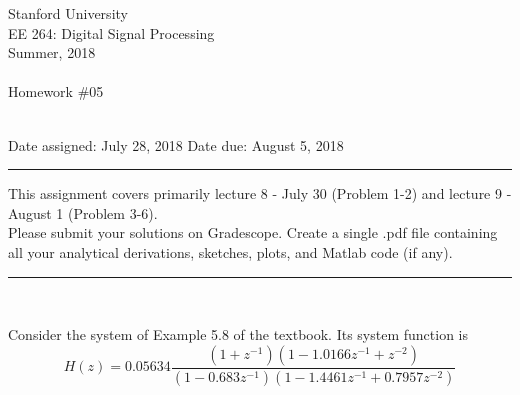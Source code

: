 \documentclass[12pt]{report}
\begin{document}
\thispagestyle{empty}
\begin{centering}
	{\large Stanford University}\\
	{\large EE 264: Digital Signal Processing}\\
	{\large Summer, 2018} \\
	\mbox{}\\
	{\large Homework \#05}\\
	\mbox{}\\
\end{centering}
\noindent Date assigned:  July 28, 2018 \hfill
Date due: August 5, 2018\\
\noindent \rule{6.5 in}{0.5pt}
  This assignment covers primarily lecture 8 - July 30 (Problem 1-2) and lecture 9 - August 1 (Problem 3-6). \\
  Please submit your solutions on Gradescope. Create a single .pdf file containing all your analytical derivations, sketches, plots, and Matlab code (if any). \\
\noindent
\rule{6.5 in}{0.5pt}
\mbox{}\\


Consider the system of Example 5.8 of the textbook. Its system function is
\begin{equation}
H(z) = 0.05634\frac{(1+z^{-1})(1 -1.0166z^{-1} + z^{-2})}{(1-0.683z^{-1})(1 -1.4461z^{-1} + 0.7957z^{-2})}
\end{equation}
\end{document}

